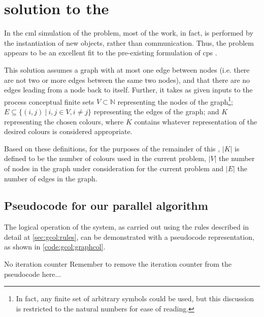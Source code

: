 \section{\label{sec:gcol:cpsys} solution to the }
In the \gls{cml} simulation of the problem, most of the work, in fact, is performed by the instantiation of new objects, rather than communication.  Thus, the problem appears to be an excellent fit to the pre-existing formulation of \gls{cps} \cite{Nicolescu2018}.

This solution assumes a graph with at most one edge between nodes (i.e. there are not two or more edges between the same two nodes), and that there are no edges leading from a node back to itself.  Further, it takes as given inputs to the process conceptual finite sets \(V \subset \mathbb{N}\) representing the nodes of the graph\footnote{In fact, any finite set of arbitrary symbols could be used, but this discussion is restricted to the natural numbers for ease of reading.}; \(E \subseteq \{(i,j)~|~i, j \in V, i \neq j \}\) representing the edges of the graph; and \(K\) representing the chosen colours, where \(K\) contains whatever representation of the desired colours is considered appropriate.

Based on these definitions, for the purposes of the remainder of this , \(|K|\) is defined to be the number of colours used in the current problem, \(|V|\) the number of nodes in the graph under consideration for the current problem and \(|E|\) the number of edges in the graph.

\subsection{Pseudocode for our parallel algorithm}
The logical operation of the system, as carried out using the rules described in detail at \cref{sec:gcol:rules}, can be demonstrated with a pseudocode representation, as shown in \cref{code:gcol:graphcol}.%

\begin{anfxerror}{No iteration counter}
Remember to remove the iteration counter from the pseudocode here...
\end{anfxerror}

